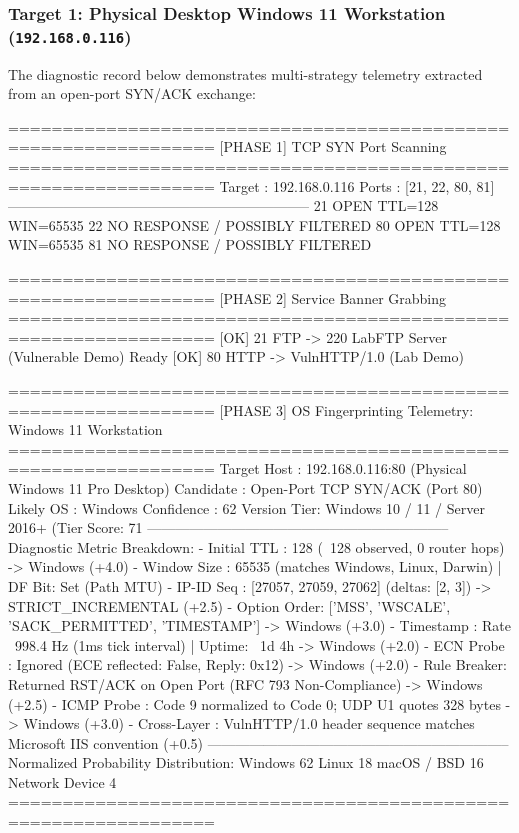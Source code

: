 \subsubsection{Target 1: Physical Desktop Windows 11 Workstation (\texttt{192.168.0.116})}
The diagnostic record below demonstrates multi-strategy telemetry extracted from an open-port SYN/ACK exchange:

\begin{logbox}
=================================================================
  [PHASE 1] TCP SYN Port Scanning
=================================================================
  Target      : 192.168.0.116
  Ports       : [21, 22, 80, 81]
-----------------------------------------------------------------
     21  OPEN                           TTL=128 WIN=65535
     22  NO RESPONSE / POSSIBLY FILTERED
     80  OPEN                           TTL=128 WIN=65535
     81  NO RESPONSE / POSSIBLY FILTERED

=================================================================
  [PHASE 2] Service Banner Grabbing
=================================================================
  [OK]  21  FTP      -> 220 LabFTP Server (Vulnerable Demo) Ready
  [OK]  80  HTTP     -> VulnHTTP/1.0 (Lab Demo)

=================================================================
  [PHASE 3] OS Fingerprinting Telemetry: Windows 11 Workstation
=================================================================
  Target Host : 192.168.0.116:80 (Physical Windows 11 Pro Desktop)
  Candidate   : Open-Port TCP SYN/ACK (Port 80)
  Likely OS   : Windows                 Confidence : 62%
  Version Tier: Windows 10 / 11 / Server 2016+ (Tier Score: 71%
-----------------------------------------------------------------
  Diagnostic Metric Breakdown:
    - Initial TTL : 128 (~128 observed, 0 router hops) -> Windows (+4.0)
    - Window Size : 65535 (matches Windows, Linux, Darwin) | DF Bit: Set (Path MTU)
    - IP-ID Seq   : [27057, 27059, 27062] (deltas: [2, 3]) -> STRICT_INCREMENTAL (+2.5)
    - Option Order: ['MSS', 'WSCALE', 'SACK_PERMITTED', 'TIMESTAMP'] -> Windows (+3.0)
    - Timestamp   : Rate ~998.4 Hz (1ms tick interval) | Uptime: ~1d 4h -> Windows (+2.0)
    - ECN Probe   : Ignored (ECE reflected: False, Reply: 0x12) -> Windows (+2.0)
    - Rule Breaker: Returned RST/ACK on Open Port (RFC 793 Non-Compliance) -> Windows (+2.5)
    - ICMP Probe  : Code 9 normalized to Code 0; UDP U1 quotes 328 bytes -> Windows (+3.0)
    - Cross-Layer : VulnHTTP/1.0 header sequence matches Microsoft IIS convention (+0.5)
-----------------------------------------------------------------
  Normalized Probability Distribution:
    Windows           62%
    Linux             18%
    macOS / BSD       16%
    Network Device     4%
=================================================================
\end{logbox}

